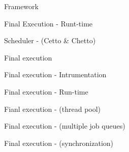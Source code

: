 \documentclass[xcolor=dvipsnames]{beamer}
\begin{document}
\begin{section}{Framework}
\begin{frame}{\hskip 0.3cm Final Execution - Runt-time}
\end{frame}












\begin{frame}{\hskip 0.3cm Scheduler - (Cetto \& Chetto)}
\end{frame}












\begin{frame}{\hskip 0.3cm Final execution}
\end{frame}












\begin{frame}{\hskip 0.3cm Final execution - Intrumentation}
\end{frame}












\begin{frame}{\hskip 0.3cm Final execution - Run-time}
\end{frame}












\begin{frame}{\hskip 0.3cm Fianl execution - (thread pool)}
\end{frame}












\begin{frame}{\hskip 0.3cm Final execution - (multiple job queues)}
\end{frame}












\begin{frame}{\hskip 0.3cm Final execution - (synchronization)}
\end{frame}












\end{section}
\end{document}
